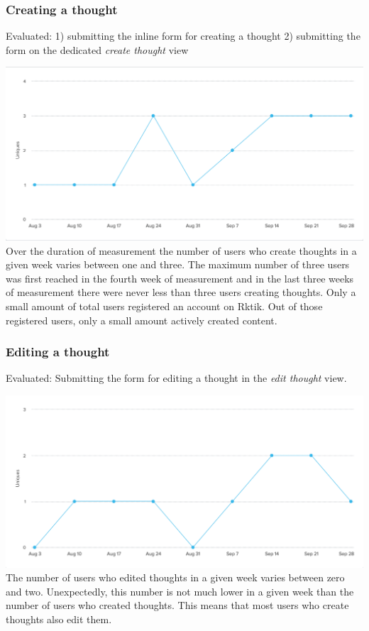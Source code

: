 \subsubsection{Creating a thought}\label{creating-a-thought}

Evaluated: 1) submitting the inline form for creating a thought 2)
submitting the form on the dedicated \emph{create thought} view

\includegraphics{img/eval_create_thought.png}\\
 Over the duration of measurement the number of users who create
thoughts in a given week varies between one and three. The maximum
number of three users was first reached in the fourth week of
measurement and in the last three weeks of measurement there were never
less than three users creating thoughts. Only a small amount of total
users registered an account on Rktik. Out of those registered users,
only a small amount actively created content.

\subsubsection{Editing a thought}\label{editing-a-thought}

Evaluated: Submitting the form for editing a thought in the \emph{edit
thought} view.

\includegraphics{img/eval_edit_thought.png}\\
 The number of users who edited thoughts in a given week varies between
zero and two. Unexpectedly, this number is not much lower in a given
week than the number of users who created thoughts. This means that most
users who create thoughts also edit them.

